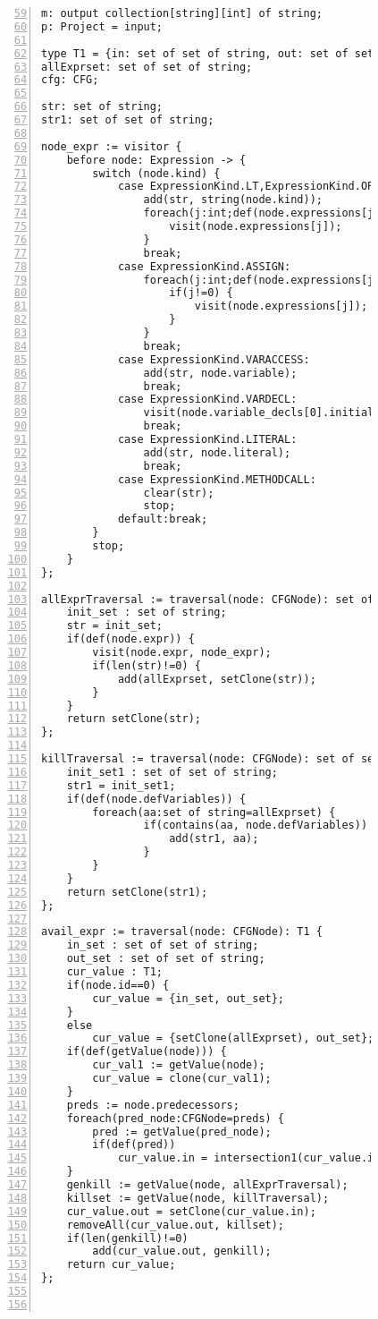 \begin{figure}[ht!]
\begin{lstlisting}[numbers=left, tabsize=4, escapechar=@, caption={Available expression analysis},label={lst:ae-code},firstline=59, firstnumber=59] 
m: output collection[string][int] of string;
p: Project = input;

type T1 = {in: set of set of string, out: set of set of string};
allExprset: set of set of string;
cfg: CFG;

str: set of string;
str1: set of set of string;

node_expr := visitor {
	before node: Expression -> {
		switch (node.kind) {
			case ExpressionKind.LT,ExpressionKind.OP_ADD, ExpressionKind.OP_SUB, ExpressionKind.OP_INC, ExpressionKind.OP_MULT, ExpressionKind.OP_DIV, ExpressionKind.OP_MOD, ExpressionKind.OP_DEC, ExpressionKind.GT, ExpressionKind.EQ, ExpressionKind.NEQ, ExpressionKind.LTEQ, ExpressionKind.GTEQ, ExpressionKind.LOGICAL_NOT, ExpressionKind.LOGICAL_AND, ExpressionKind.LOGICAL_OR, ExpressionKind.BIT_AND, ExpressionKind.BIT_OR, ExpressionKind.BIT_NOT, ExpressionKind.BIT_XOR, ExpressionKind.BIT_LSHIFT, ExpressionKind.BIT_RSHIFT, ExpressionKind.BIT_UNSIGNEDRSHIFT:
				add(str, string(node.kind)); 
				foreach(j:int;def(node.expressions[j])) {
					visit(node.expressions[j]);
				}
				break;
			case ExpressionKind.ASSIGN:
				foreach(j:int;def(node.expressions[j])) {
					if(j!=0) {
						visit(node.expressions[j]);
					}
				}
				break;
			case ExpressionKind.VARACCESS:
				add(str, node.variable);
				break;
			case ExpressionKind.VARDECL:
				visit(node.variable_decls[0].initializer);
				break;
			case ExpressionKind.LITERAL:
				add(str, node.literal);
				break;
			case ExpressionKind.METHODCALL:
				clear(str);
				stop;
			default:break;
		}
		stop;
	}
};

allExprTraversal := traversal(node: CFGNode): set of string {
	init_set : set of string;
	str = init_set;
	if(def(node.expr)) {
		visit(node.expr, node_expr);
		if(len(str)!=0) {
			add(allExprset, setClone(str));
		}
	}
	return setClone(str);
};

killTraversal := traversal(node: CFGNode): set of set of string {
	init_set1 : set of set of string;
	str1 = init_set1;
	if(def(node.defVariables)) {
		foreach(aa:set of string=allExprset) {
				if(contains(aa, node.defVariables)) {
					add(str1, aa);
				}
		}
	}
	return setClone(str1);
};

avail_expr := traversal(node: CFGNode): T1 {
	in_set : set of set of string;
	out_set : set of set of string;
	cur_value : T1;
	if(node.id==0) {
		cur_value = {in_set, out_set};
	}
	else
		cur_value = {setClone(allExprset), out_set};
	if(def(getValue(node))) {
		cur_val1 := getValue(node);
		cur_value = clone(cur_val1);
	}
	preds := node.predecessors;
	foreach(pred_node:CFGNode=preds) {	
		pred := getValue(pred_node);
		if(def(pred))
			cur_value.in = intersection1(cur_value.in, pred.out);
	}
	genkill := getValue(node, allExprTraversal);
	killset := getValue(node, killTraversal);
	cur_value.out = setClone(cur_value.in);
	removeAll(cur_value.out, killset);
	if(len(genkill)!=0)
		add(cur_value.out, genkill);
	return cur_value;
};



\end{lstlisting}
\end{figure}
